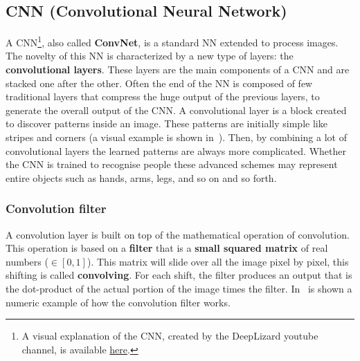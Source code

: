 \subsection{CNN (Convolutional Neural Network)} \label{sec:cnn}
A CNN\footnote{A visual explanation of the CNN, created by the DeepLizard youtube channel, is available \href{https://www.youtube.com/watch?v=YRhxdVk_sIs}{here}.}, also called \textbf{ConvNet}, is a standard NN extended to process images.\\
The novelty of this NN is characterized by a new type of layers: the \textbf{convolutional layers}. These layers are the main components of a CNN and are stacked one after the other. Often the end of the NN is composed of few traditional layers that compress the huge output of the previous layers, to generate the overall output of the CNN. A convolutional layer is a block created to discover patterns inside an image. These patterns are initially simple like stripes and corners (a visual example is shown in~). Then, by combining a lot of convolutional layers the learned patterns are always more complicated. Whether the CNN is trained to recognise people these advanced schemes may represent entire objects such as hands, arms, legs, and so on and so forth.

\subsubsection*{Convolution filter}
A convolution layer is built on top of the mathematical operation of convolution.\\
This operation is based on a \textbf{filter} that is a \textbf{small squared matrix} of real numbers ($\in [0, 1]$). This matrix will slide over all the image pixel by pixel, this shifting is called \textbf{convolving}. For each shift, the filter produces an output that is the dot-product of the actual portion of the image times the filter. In~ is shown a numeric example of how the convolution filter works.

